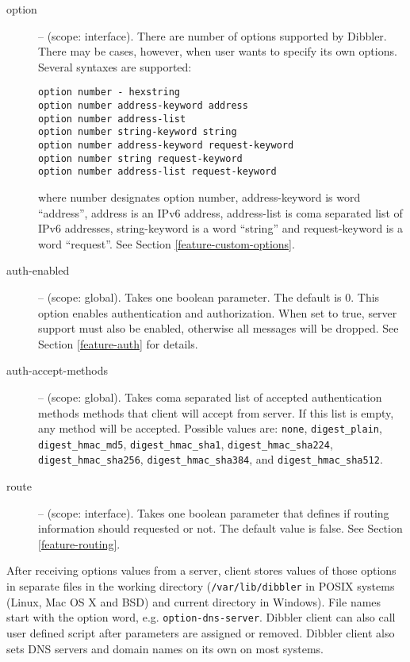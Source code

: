 \begin{description}
\item[option] -- (scope: interface). There are number of options
   supported by Dibbler. There may be cases, however, when user wants
   to specify its own options. Several syntaxes are supported:
\begin{lstlisting}
option number - hexstring
option number address-keyword address
option number address-list
option number string-keyword string
option number address-keyword request-keyword
option number string request-keyword
option number address-list request-keyword
\end{lstlisting}
where number designates option number, address-keyword is word ``address'',
address is an IPv6 address, address-list is coma separated list of
IPv6 addresses, string-keyword is a word ``string'' and
request-keyword is a word ``request''. See Section \ref{feature-custom-options}.

 \item[auth-enabled] -- (scope: global). Takes one boolean
   parameter. The default is 0. This option enables authentication and
   authorization. When set to true, server support must also be
   enabled, otherwise all messages will be dropped. See
   Section \ref{feature-auth} for details.

 \item[auth-accept-methods] -- (scope: global). Takes coma separated
   list of accepted authentication methods methods that client will
   accept from server. If this list is empty, any method will be
   accepted. Possible values
   are: \texttt{none}, \texttt{digest\_plain}, \texttt{digest\_hmac\_md5},
   \texttt{digest\_hmac\_sha1}, \texttt{digest\_hmac\_sha224},
   \texttt{digest\_hmac\_sha256}, \texttt{digest\_hmac\_sha384},
   and \texttt{digest\_hmac\_sha512}.

 \item[route] -- (scope: interface). Takes one boolean parameter that
 defines if routing information should requested or not. The default
 value is false. See Section \ref{feature-routing}.

\end{description}

After receiving options values from a server, client stores values of
those options in separate files in the working directory
(\verb+/var/lib/dibbler+ in POSIX systems (Linux, Mac OS X and BSD)
and current directory in Windows). File names start with the option
word, e.g. \verb+option-dns-server+. Dibbler client can also call user
defined script after parameters are assigned or removed. Dibbler
client also sets DNS servers and domain names on its own on most
systems.

